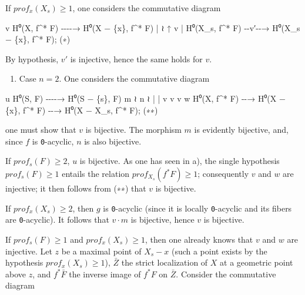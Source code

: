 \documentclass[
]{article}
\newenvironment{Shaded}{}{}
\newcommand{\NormalTok}[1]{#1}
\providecommand{\tightlist}{%
  \setlength{\itemsep}{0pt}\setlength{\parskip}{0pt}}
\begin{document}
If \(prof_{x}(X_{s}) \geqslant 1\), one considers the commutative
diagram

\begin{Shaded}
\begin{Highlighting}[]
\NormalTok{                          v}
\NormalTok{H⁰(X, f\^{}* F)          {-}{-}{-}{-}→    H⁰(X − \{x\}, f\^{}* F)}
\NormalTok{    | ≀                            ↑}
\NormalTok{    v                              |}
\NormalTok{H⁰(X\_s, f\^{}* F)        {-}{-}v′{-}{-}→ H⁰(X\_s − \{x\}, f\^{}* F);}
\NormalTok{(∗)}
\end{Highlighting}
\end{Shaded}

By hypothesis, \(v'\) is injective, hence the same holds for \(v\).

\begin{enumerate}
\def\labelenumi{\alph{enumi})}
\setcounter{enumi}{1}
\tightlist
\item
  Case \(n = 2\). One considers the commutative diagram
\end{enumerate}

\begin{Shaded}
\begin{Highlighting}[]
\NormalTok{            u}
\NormalTok{H⁰(S, F)  {-}{-}{-}{-}→   H⁰(S − \{s\}, F)}
\NormalTok{   m ≀                  n ≀}
\NormalTok{   |                      |}
\NormalTok{   v                      v}
\NormalTok{            v                     w}
\NormalTok{H⁰(X, f\^{}* F) {-}{-}→ H⁰(X − \{x\}, f\^{}* F) {-}{-}→ H⁰(X − X\_s, f\^{}* F);}
\NormalTok{(∗∗)}
\end{Highlighting}
\end{Shaded}

one must show that \(v\) is bijective. The morphism \(m\) is evidently
bijective, and, since \(f\) is \texttt{0}-acyclic, \(n\) is also
bijective.

If \(prof_{s}(F) \geqslant 2\), \(u\) is bijective. As one has seen in
a), the single hypothesis \(prof_{s}(F) \geqslant 1\) entails the
relation \(prof_{X_{s}}(f^{*} F) \geqslant 1\); consequently \(v\) and
\(w\) are injective; it then follows from (∗∗) that \(v\) is bijective.

If \(prof_{x}(X_{s}) \geqslant 2\), then \(g\) is \texttt{0}-acyclic
(since it is locally \texttt{0}-acyclic and its fibers are
\texttt{0}-acyclic). It follows that \(v \cdot m\) is bijective, hence
\(v\) is bijective.

If \(prof_{s}(F) \geqslant 1\) and \(prof_{x}(X_{s}) \geqslant 1\), then
one already knows that \(v\) and \(w\) are injective. Let \(z\) be a
maximal point of \(X_{s} - {x}\) (such a point exists by the hypothesis
\(prof_{x}(X_{s}) \geqslant 1\)), \(\bar{Z}\) the strict localization of
\(X\) at a geometric point above \(z\), and \(f^{*} \bar{F}\) the
inverse image of \(f^{*} F\) on \(\bar{Z}\). Consider the commutative
diagram
\end{document}
